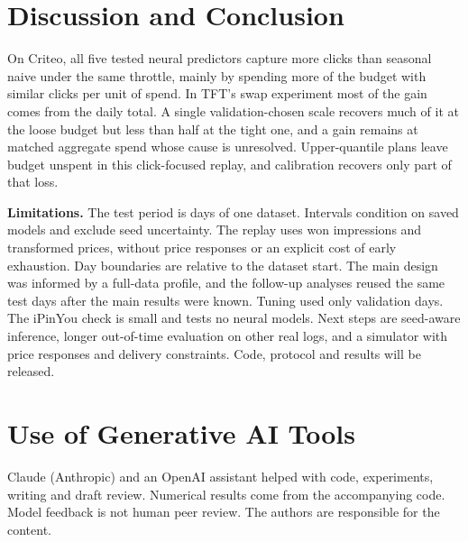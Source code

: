 \documentclass[sigconf,nonacm]{acmart}
\begin{document}
\section{Discussion and Conclusion}

On Criteo, all five tested neural predictors capture more clicks than seasonal
naive under the same throttle, mainly by spending more of the budget with
similar clicks per unit of spend. In TFT's swap experiment most of the gain
comes from the daily total. A single validation-chosen scale recovers much of
it at the loose budget but less than half at the tight one, and a gain
remains at matched aggregate spend whose cause is unresolved. Upper-quantile
plans leave budget unspent in this click-focused replay, and calibration
recovers only part of that loss.

\textbf{Limitations.} The test period is  days of one
dataset. Intervals condition on saved models and exclude seed uncertainty. The
replay uses won impressions and transformed prices, without price responses or
an explicit cost of early exhaustion. Day boundaries are relative to the
dataset start. The main design was informed by a full-data profile, and the
follow-up analyses reused the same test days after the main results were
known. Tuning used only  validation days. The iPinYou check
is small and tests no neural models. Next steps are seed-aware inference,
longer out-of-time evaluation on other real logs, and a simulator with price
responses and delivery constraints. Code, protocol and results will be
released.

\section*{Use of Generative AI Tools}
Claude (Anthropic) and an OpenAI assistant helped with code, experiments,
writing and draft review. Numerical results come from the accompanying code.
Model feedback is not human peer review. The authors are responsible for the
content.



\end{document}
